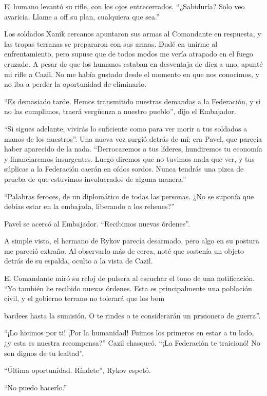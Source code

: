 \documentclass[spanish,12pt,a4paper,oneside,titlepage]{book}
\begin{document}
    El humano levantó su rifle, con los ojos entrecerrados. ``¿Sabiduría? Solo veo avaricia. Llame a off su plan, cualquiera que sea.''

    Los soldados Xanik cercanos apuntaron sus armas al Comandante en respuesta, y las tropas terranas se prepararon con sus armas. Dudé en unirme al enfrentamiento, pero supuse que de todos modos me vería atrapado en el fuego cruzado. A pesar de que los humanos estaban en desventaja de diez a uno, apunté mi rifle a Cazil. No me había gustado desde el momento en que nos conocimos, y no iba a perder la oportunidad de eliminarlo.

    ``Es demasiado tarde. Hemos transmitido nuestras demandas a la Federación, y si no las cumplimos, traerá vergüenza a nuestro pueblo'', dijo el Embajador.

    ``Si sigues adelante, vivirás lo suficiente como para ver morir a tus soldados a manos de los nuestros''. Una nueva voz surgió detrás de mí; era Pavel, que parecía haber aparecido de la nada. ``Derrocaremos a tus líderes, hundiremos tu economía y financiaremos insurgentes. Luego diremos que no tuvimos nada que ver, y tus súplicas a la Federación caerán en oídos sordos. Nunca tendrás una pizca de prueba de que estuvimos involucrados de alguna manera.''

    ``Palabras feroces, de un diplomático de todas las personas. ¿No se suponía que debías estar en la embajada, liberando a los rehenes?''

    Pavel se acercó al Embajador. ``Recibimos nuevas órdenes''.

    A simple vista, el hermano de Rykov parecía desarmado, pero algo en su postura me pareció extraño. Al observarlo más de cerca, noté que sostenía un objeto detrás de su espalda, oculto a la vista de Cazil.

    El Comandante miró su reloj de pulsera al escuchar el tono de una notificación. ``Yo también he recibido nuevas órdenes. Esta es principalmente una población civil, y el gobierno terrano no tolerará que los bom

    bardees hasta la sumisión. O te rindes o te considerarán un prisionero de guerra''.

    ``¡Lo hicimos por ti! ¡Por la humanidad! Fuimos los primeros en estar a tu lado, ¿y esta es nuestra recompensa?'' Cazil chasqueó. ``¡La Federación te traicionó! No son dignos de tu lealtad''.

    ``Última oportunidad. Ríndete'', Rykov espetó.

    ``No puedo hacerlo.''
\end{document}
